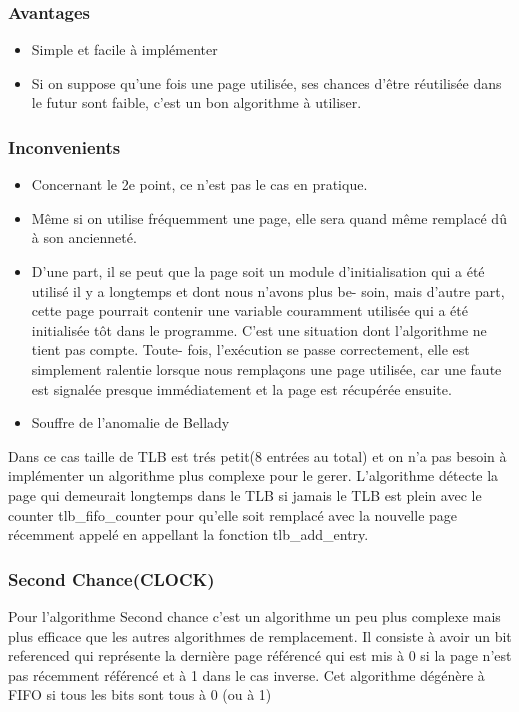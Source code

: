 \documentclass{article}
\begin{document}
\subsubsection*{Avantages}
\begin{itemize}
\item Simple et facile à implémenter
\item Si on suppose qu’une fois une page utilisée, ses chances d’être réutilisée
dans le futur sont faible, c’est un bon algorithme à utiliser.
\end{itemize}
\subsubsection*{Inconvenients}
\begin{itemize}
\item Concernant le 2e point, ce n’est pas le cas en pratique.
\item Même si on utilise fréquemment une page, elle sera quand même
remplacé dû à son ancienneté.
\item D’une part, il se peut que la page soit un module d’initialisation
qui a été utilisé il y a longtemps et dont nous n’avons plus be-
soin, mais d’autre part, cette page pourrait contenir une variable
couramment utilisée qui a été initialisée tôt dans le programme.
C’est une situation dont l’algorithme ne tient pas compte. Toute-
fois, l’exécution se passe correctement, elle est simplement ralentie
lorsque nous remplaçons une page utilisée, car une faute est signalée
presque immédiatement et la page est récupérée ensuite.
\item Souffre de l’anomalie de Bellady
\end{itemize}
Dans ce cas taille de TLB est trés petit(8 entrées au total) et on n'a pas besoin à implémenter un algorithme plus complexe pour le gerer. L'algorithme détecte la page qui demeurait longtemps dans le TLB si jamais le TLB est plein avec le counter tlb\_fifo\_counter pour qu'elle soit remplacé avec la nouvelle page récemment appelé en appellant la fonction tlb\_add\_entry.

\subsubsection{Second Chance(CLOCK)}
Pour l’algorithme Second chance c'est un algorithme un peu plus complexe mais plus efficace que les autres algorithmes de remplacement. Il consiste à avoir un bit referenced qui représente la dernière page référencé qui est mis à 0 si la page n'est pas récemment référencé et à 1 dans le cas inverse.
Cet algorithme dégénère à FIFO si tous les bits sont tous à 0 (ou à 1) 
\end{document}
